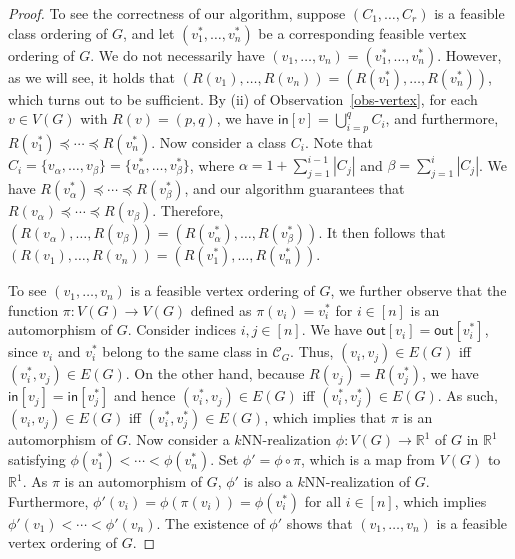 \documentclass[english]{lipics-v2021}
\begin{document}
\begin{proof}
To see the correctness of our algorithm, suppose $(C_1,\dots,C_r)$ is a feasible class ordering of $G$, and let $(v_1^*,\dots,v_n^*)$ be a corresponding feasible vertex ordering of $G$.
We do not necessarily have $(v_1,\dots,v_n) = (v_1^*,\dots,v_n^*)$.
However, as we will see, it holds that $(R(v_1),\dots,R(v_n)) = (R(v_1^*),\dots,R(v_n^*))$, which turns out to be sufficient.
By (ii) of Observation~\ref{obs-vertex}, for each $v \in V(G)$ with $R(v) = (p,q)$, we have $\mathsf{in}[v] = \bigcup_{i=p}^q C_i$, and furthermore, $R(v_1^*) \preceq \cdots \preceq R(v_n^*)$.
Now consider a class $C_i$.
Note that $C_i = \{v_\alpha,\dots,v_\beta\} = \{v_\alpha^*,\dots,v_\beta^*\}$, where $\alpha = 1+\sum_{j=1}^{i-1} |C_j|$ and $\beta = \sum_{j=1}^i |C_j|$.
We have $R(v_\alpha^*) \preceq \cdots \preceq R(v_\beta^*)$, and our algorithm guarantees that $R(v_\alpha) \preceq \cdots \preceq R(v_\beta)$.
Therefore, $(R(v_\alpha),\dots,R(v_\beta)) = (R(v_\alpha^*),\dots,R(v_\beta^*))$.
It then follows that $(R(v_1),\dots,R(v_n)) = (R(v_1^*),\dots,R(v_n^*))$.

To see $(v_1,\dots,v_n)$ is a feasible vertex ordering of $G$, we further observe that the function $\pi:V(G) \rightarrow V(G)$ defined as $\pi(v_i) = v_i^*$ for $i \in [n]$ is an automorphism of $G$.
Consider indices $i,j \in [n]$.
We have $\mathsf{out}[v_i] = \mathsf{out}[v_i^*]$, since $v_i$ and $v_i^*$ belong to the same class in $\mathcal{C}_G$.
Thus, $(v_i,v_j) \in E(G)$ iff $(v_i^*,v_j) \in E(G)$.
On the other hand, because $R(v_j) = R(v_j^*)$, we have $\mathsf{in}[v_j] = \mathsf{in}[v_j^*]$ and hence $(v_i^*,v_j) \in E(G)$ iff $(v_i^*,v_j^*) \in E(G)$.
As such, $(v_i,v_j) \in E(G)$ iff $(v_i^*,v_j^*) \in E(G)$, which implies that $\pi$ is an automorphism of $G$.
Now consider a $k$NN-realization $\phi:V(G) \rightarrow \mathbb{R}^1$ of $G$ in $\mathbb{R}^1$ satisfying $\phi(v_1^*) < \cdots < \phi(v_n^*)$.
Set $\phi' = \phi \circ \pi$, which is a map from $V(G)$ to $\mathbb{R}^1$.
As $\pi$ is an automorphism of $G$, $\phi'$ is also a $k$NN-realization of $G$.
Furthermore, $\phi'(v_i) = \phi(\pi(v_i)) = \phi(v_i^*)$ for all $i \in [n]$, which implies $\phi'(v_1) < \cdots < \phi'(v_n)$.
The existence of $\phi'$ shows that $(v_1,\dots,v_n)$ is a feasible vertex ordering of $G$.
\end{proof}
\end{document}
